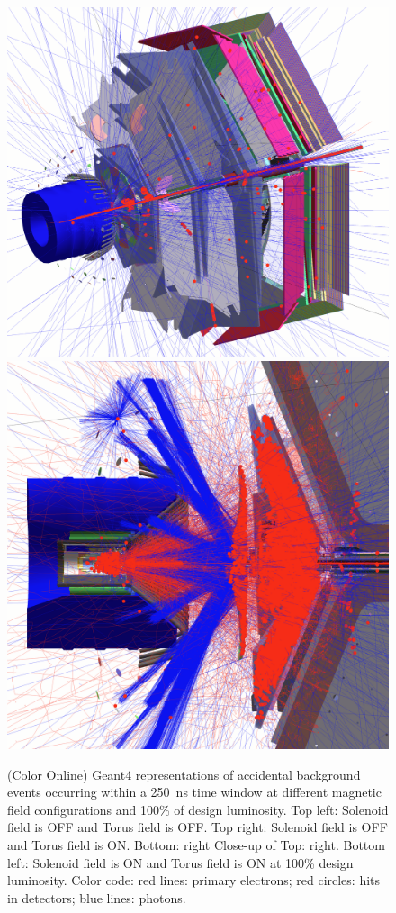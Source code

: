 \documentclass[final,3p,twocolumn]{elsarticle}
\begin{document}
\begin{figure}[htbp!]
{}
\vspace{0.3cm}
\centerline{
	\includegraphics[width=1.0\columnwidth, height=1.0\columnwidth]{FullSolenoidFullTorus.png}
	\includegraphics[width=1.0\columnwidth, height=1.0\columnwidth]{NoSolenoidFullTorusCut2.png}
}
\caption{(Color Online) Geant4 representations of accidental background events occurring within a 250~ns time window at different
magnetic field configurations and 100\% of design luminosity. Top left: Solenoid field is OFF and Torus field is OFF. Top
right: Solenoid field is OFF and Torus field is ON. Bottom: right Close-up of Top: right.  Bottom left: Solenoid field is ON
and Torus field is ON at 100\% design luminosity. Color code: red lines: primary electrons; red circles: hits in detectors; blue lines:
photons. }
\label{gemc-event}
\end{figure}
\end{document}
